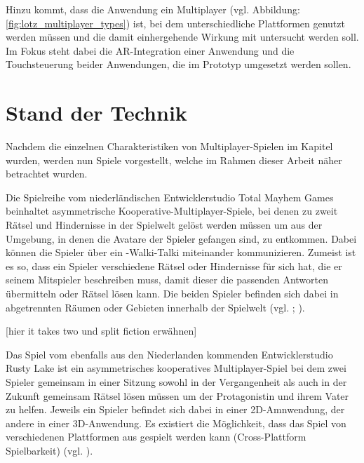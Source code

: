 Hinzu kommt, dass die Anwendung ein  Multiplayer (vgl. Abbildung: \ref{fig:lotz_multiplayer_types}) ist, bei dem unterschiedliche Plattformen genutzt werden müssen und die damit einhergehende Wirkung mit untersucht werden soll. Im Fokus steht dabei die \ac{AR}-Integration einer Anwendung und die Touchsteuerung beider Anwendungen, die im Prototyp umgesetzt werden sollen.


\chapter{Stand der Technik} \label{sec:sota}

Nachdem die einzelnen Charakteristiken von Multiplayer-Spielen im Kapitel \emph{} wurden, werden nun Spiele vorgestellt, welche im Rahmen dieser Arbeit näher betrachtet wurden.

Die Spielreihe  vom niederländischen Entwicklerstudio Total Mayhem Games beinhaltet asymmetrische Kooperative-Multiplayer-Spiele, bei denen zu zweit Rätsel und Hindernisse in der Spielwelt gelöst werden müssen um aus der Umgebung, in denen die Avatare der Spieler gefangen sind, zu entkommen. Dabei können die Spieler über ein -Walki-Talki miteinander kommunizieren. Zumeist ist es so, dass ein Spieler verschiedene Rätsel oder Hindernisse für sich hat, die er seinem Mitspieler beschreiben muss, damit dieser die passenden Antworten übermitteln oder Rätsel lösen kann. Die beiden Spieler befinden sich dabei in abgetrennten Räumen oder Gebieten innerhalb der Spielwelt (vgl. \cite{noauthor_we_nodate-1}; \cite{noauthor_total_nodate}).  

[hier it takes two und split fiction erwähnen]

Das Spiel  vom ebenfalls aus den Niederlanden kommenden Entwicklerstudio Rusty Lake ist ein asymmetrisches kooperatives Multiplayer-Spiel bei dem zwei Spieler gemeinsam in einer Sitzung sowohl in der Vergangenheit als auch in der Zukunft gemeinsam Rätsel lösen müssen um der Protagonistin und ihrem Vater zu helfen. Jeweils ein Spieler befindet sich dabei in einer 2D-Amnwendung, der andere in einer 3D-Anwendung. Es existiert die Möglichkeit, dass das Spiel von verschiedenen Plattformen aus gespielt werden kann (Cross-Plattform Spielbarkeit) (vgl. \cite{noauthor_past_nodate}). 


